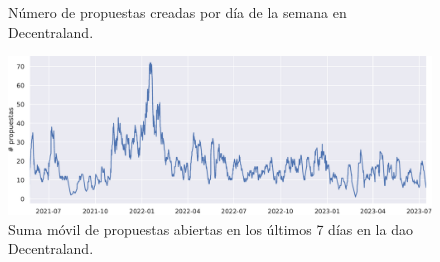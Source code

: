 \begin{figure}[t]
\begin{minipage}[t]{.48\linewidth}
        \caption{Número de propuestas creadas por día de la semana en Decentraland.}
        \label{fig:04-propuestas-semana}
    \end{minipage}
\end{figure}

\begin{figure}[p]
    \centering
    \includegraphics[width=\linewidth]{figures/04_exploracion/04c_rolling_proposals_7D_Decentraland.pdf}
    \caption[Propuestas abiertas en los últimos 7 días en la DAO Decentraland.]{Suma móvil de propuestas abiertas en los últimos 7 días en la \gls{dao} Decentraland.}
    \label{fig:rolling_proposals}
\end{figure}

